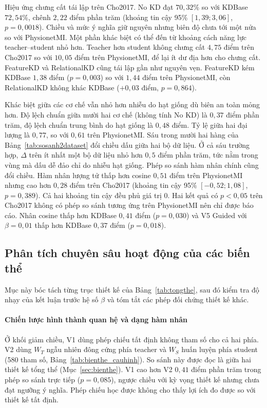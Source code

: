 Hiệu ứng chưng cất tái lập trên Cho2017. No KD đạt $70{,}32\%$ so với
KDBase $72{,}54\%$, chênh $2{,}22$ điểm phần trăm (khoảng tin cậy 95\%
$[1{,}39; 3{,}06]$, $p = 0{,}0018$). Chiều và mức ý nghĩa giữ nguyên nhưng
biên độ chưa tới một nửa so với PhysionetMI. Một phần khác biệt có thể đến
từ khoảng cách năng lực teacher--student nhỏ hơn. Teacher hơn student không
chưng cất $4{,}75$ điểm trên Cho2017 so với $10{,}05$ điểm trên
PhysionetMI, để lại ít dư địa hơn cho chưng cất. FeatureKD và RelationalKD
cũng tái lập gần như nguyên vẹn. FeatureKD kém KDBase $1{,}38$ điểm
($p = 0{,}003$) so với $1{,}44$ điểm trên PhysionetMI, còn RelationalKD
không khác KDBase ($+0{,}03$ điểm, $p = 0{,}864$).

Khác biệt giữa các cơ chế vẫn nhỏ hơn nhiễu do hạt giống dù biên an toàn
mỏng hơn. Độ lệch chuẩn giữa mười hai cơ chế (không tính No KD) là $0{,}37$
điểm phần trăm, độ lệch chuẩn trung bình do hạt giống là $0{,}48$ điểm. Tỷ
lệ giữa hai đại lượng là $0{,}77$, so với $0{,}61$ trên PhysionetMI. Sáu
trong mười hai hàng của Bảng~\ref{tab:sosanh2dataset} đổi chiều dấu giữa
hai bộ dữ liệu. Ở cả sáu trường hợp, $\Delta$ trên ít nhất một bộ dữ liệu
nhỏ hơn $0{,}5$ điểm phần trăm, tức nằm trong vùng mà dấu dễ đảo chỉ do
nhiễu hạt giống. Phép so sánh hàm nhân chính cũng đổi chiều. Hàm nhân lượng
tử thấp hơn cosine $0{,}51$ điểm trên PhysionetMI nhưng cao hơn $0{,}28$
điểm trên Cho2017 (khoảng tin cậy 95\% $[-0{,}52; 1{,}08]$,
$p = 0{,}389$). Cả hai khoảng tin cậy đều phủ giá trị 0. Hai kết quả có
$p < 0{,}05$ trên Cho2017 không có phép so sánh tương ứng trên PhysionetMI
nên chỉ được báo cáo. Nhân cosine thấp hơn KDBase $0{,}41$ điểm
($p = 0{,}030$) và V5 Guided với $\beta = 0{,}01$ thấp hơn KDBase $0{,}37$
điểm ($p = 0{,}018$).

\subsection{Phân tích chuyên sâu hoạt động của các biến thể}
\label{sec:chuyensau}

Mục này bóc tách từng trục thiết kế của Bảng~\ref{tab:tongthe}, sau đó
kiểm tra độ nhạy của kết luận trước hệ số $\beta$ và tóm tắt các phép đối
chứng thiết kế khác.

\paragraph{Chiến lược hình thành quan hệ và dạng hàm nhân}

Ở khối giảm chiều, V1 dùng phép chiếu tất định không tham số cho cả hai
phía. V2 dùng $W_T$ ngẫu nhiên đông cứng phía teacher và $W_S$ huấn luyện
phía student (580 tham số, Bảng~\ref{tab:bienthe_cauhinh}). So sánh
này được đọc là giữa hai thiết kế tổng thể (Mục~\ref{sec:bienthe}). V1 cao
hơn V2 $0{,}41$ điểm phần trăm trong phép so sánh trực tiếp
($p = 0{,}085$), ngược chiều với kỳ vọng thiết kế nhưng chưa đạt ngưỡng ý
nghĩa. Phép chiếu học được không cho thấy lợi ích đo được so với thiết kế
tất định.

